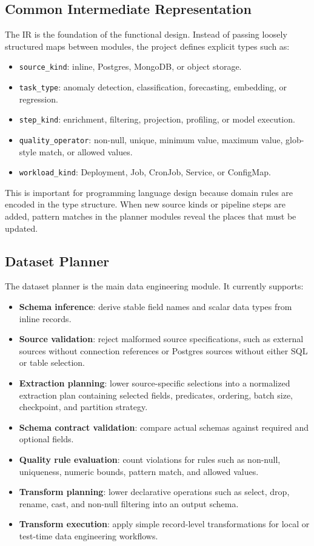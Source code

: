 \documentclass[conference]{IEEEtran}
\begin{document}
\subsection{Common Intermediate Representation}

The IR is the foundation of the functional design. Instead of passing loosely
structured maps between modules, the project defines explicit types such as:

\begin{itemize}
  \item \texttt{source\_kind}: inline, Postgres, MongoDB, or object storage.
  \item \texttt{task\_type}: anomaly detection, classification, forecasting,
  embedding, or regression.
  \item \texttt{step\_kind}: enrichment, filtering, projection, profiling, or
  model execution.
  \item \texttt{quality\_operator}: non-null, unique, minimum value, maximum
  value, glob-style match, or allowed values.
  \item \texttt{workload\_kind}: Deployment, Job, CronJob, Service, or
  ConfigMap.
\end{itemize}

This is important for programming language design because domain rules are
encoded in the type structure. When new source kinds or pipeline steps are
added, pattern matches in the planner modules reveal the places that must be
updated.

\subsection{Dataset Planner}

The dataset planner is the main data engineering module. It currently
supports:

\begin{itemize}
  \item \textbf{Schema inference}: derive stable field names and scalar data
  types from inline records.
  \item \textbf{Source validation}: reject malformed source specifications,
  such as external sources without connection references or Postgres sources
  without either SQL or table selection.
  \item \textbf{Extraction planning}: lower source-specific selections into a
  normalized extraction plan containing selected fields, predicates, ordering,
  batch size, checkpoint, and partition strategy.
  \item \textbf{Schema contract validation}: compare actual schemas against
  required and optional fields.
  \item \textbf{Quality rule evaluation}: count violations for rules such as
  non-null, uniqueness, numeric bounds, pattern match, and allowed values.
  \item \textbf{Transform planning}: lower declarative operations such as
  select, drop, rename, cast, and non-null filtering into an output schema.
  \item \textbf{Transform execution}: apply simple record-level transformations
  for local or test-time data engineering workflows.
\end{itemize}
\end{document}
